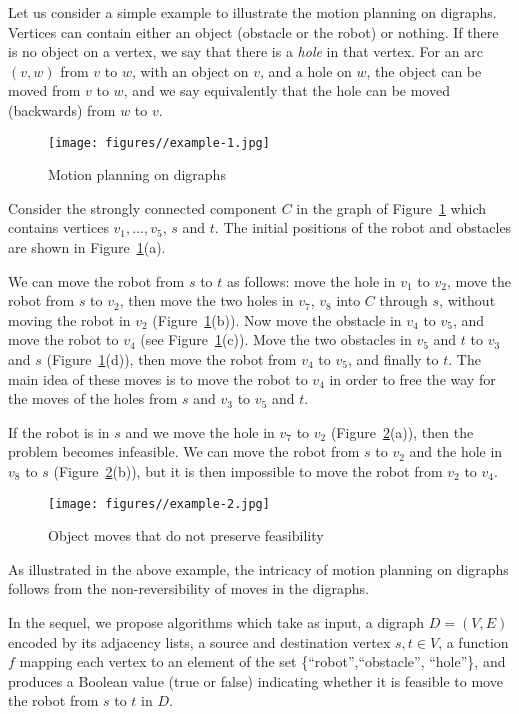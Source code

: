 \documentclass{article}
\begin{document}
Let us consider a simple example to illustrate the motion planning
on digraphs. Vertices can contain either an object (obstacle or the
robot) or nothing. If there is no object on a vertex, we say that
there is a \emph{hole} in that vertex. For an arc $(v,w)$ from $v$
to $w$, with an object on $v$, and a hole on $w$, the object can be
moved from $v$ to $w$, and we say equivalently that the hole can be
moved (backwards) from $w$ to $v$.

\begin{figure}[ht]
\centering
\texttt{[image: figures//example-1.jpg]}
\caption{Motion planning on digraphs}\label{fig:example-1}
\end{figure}


Consider the strongly connected component  $C$ in the graph of
Figure~\ref{fig:example-1} which contains vertices $v_1, ..., v_5$,
$s$ and $t$. The initial positions of the robot and obstacles are
shown in Figure~\ref{fig:example-1}(a).

We can move the robot from $s$ to $t$ as follows: move the hole in
$v_1$ to $v_2$, move the robot from $s$ to $v_2$, then move the two
holes in $v_{7}$, $v_{8}$ into $C$ through $s$, without moving the
robot in $v_2$ (Figure~\ref{fig:example-1}(b)). Now move the
obstacle in $v_4$ to $v_5$, and move the robot to $v_4$ (see
Figure~\ref{fig:example-1}(c)). Move the two obstacles in $v_5$ and
$t$ to $v_3$ and $s$ (Figure~\ref{fig:example-1}(d)), then move the
robot from $v_4$ to $v_5$, and finally to $t$. The main idea of
these moves is to move the robot to $v_4$ in order to free the way
for the moves of the holes from $s$ and $v_3$  to $v_5$ and $t$.

If the robot is in $s$ and we move the hole in $v_7$ to $v_2$
(Figure~\ref{fig:example-2}(a)), then the problem becomes
infeasible. We can move the robot from $s$ to $v_2$ and the hole in
$v_8$ to $s$ (Figure~\ref{fig:example-2}(b)), but it is then
impossible to move the robot from $v_2$ to $v_4$.

\begin{figure}[ht]
\centering
\texttt{[image: figures//example-2.jpg]}
\caption{Object moves that do not preserve feasibility}\label{fig:example-2}
\end{figure}

As illustrated in the above example, the intricacy of motion
planning on digraphs follows from the non-reversibility of moves in
the digraphs.

In the sequel, we propose algorithms which take as input, a digraph
$D=(V,E)$ encoded by its adjacency lists, a source and destination
vertex $s,t \in V$, a function $f$ mapping each vertex to an element
of the set \{``robot'',``obstacle'', ``hole''\}, and produces a
Boolean value (true or false) indicating whether it is feasible to
move the robot from $s$ to $t$ in $D$.
\end{document}
